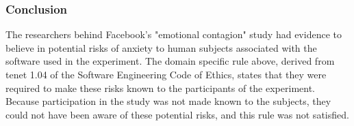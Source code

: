 \subsubsection{Conclusion}
The researchers behind Facebook's "emotional contagion" study had evidence to believe in potential risks of anxiety to human subjects associated with the software used in the experiment.  The domain specific rule above, derived from tenet 1.04 of the Software Engineering Code of Ethics, states that they were required to make these risks known to the participants of the experiment.  Because participation in the study was not made known to the subjects, they could not have been aware of these potential risks, and this rule was not satisfied.
\vspace{0.2cm}